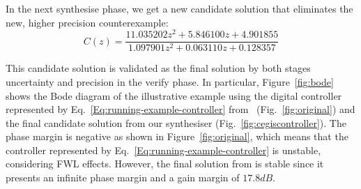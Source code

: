 \documentclass{sig-alternate-05-2015}
\newcommand{\blue}[1]{{\color{blue}#1}}
\begin{document}
In the next {\sc synthesise} phase, we get a new candidate solution that
eliminates the new, higher precision counterexample:
%
$$ C(z)=\frac{11.035202z^2{+}5.846100z{+}4.901855}{1.097901z^2{+}0.063110z{+}0.128357} $$
%

This candidate solution is validated as the final solution by both stages
{\sc uncertainty} and {\sc precision} in the {\sc verify} phase.
In particular, Figure~\ref{fig:bode} shows the Bode diagram of the illustrative example 
using the digital controller represented by Eq.~\eqref{Eq:running-example-controller} from~\cite{DBLP:conf/hybrid/WangGRJF16} 
(Fig.~\ref{fig:original}) and the final candidate solution from our synthesiser (Fig.~\ref{fig:cegiscontroller}). 
The phase margin is negative as shown in Figure~\ref{fig:original}, which means that the controller 
represented by Eq.~\eqref{Eq:running-example-controller} is unstable, considering FWL effects. 
However, the final solution from \tool is stable since it presents an infinite phase margin 
and a gain margin of $17.8 dB$.




\end{document}
